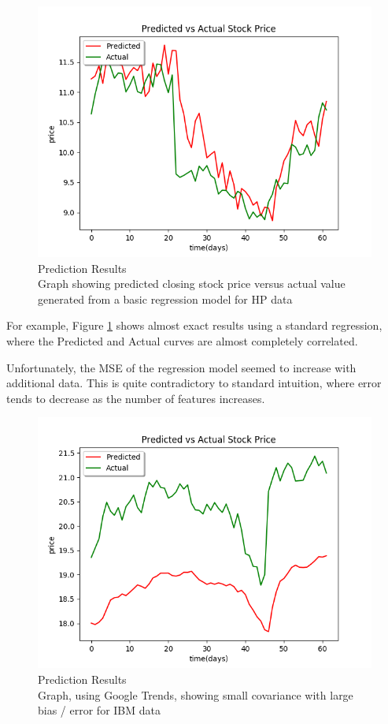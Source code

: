 \documentclass{article}
\begin{document}
\begin{figure}[H]
	\centering
    \includegraphics[scale=0.5]{googleHP.png}
  \caption{Prediction Results \\
  \small Graph showing predicted closing stock price versus actual value generated from a basic regression model for HP data}
  \label{fig:googlehp}
\end{figure}
For example, Figure \ref{fig:googlehp} shows almost exact results using a standard regression, where the Predicted and Actual curves are almost completely correlated. 

Unfortunately, the MSE of the regression model seemed to increase with additional data. This is quite contradictory to standard intuition, where error tends to decrease as the number of features increases. 

\begin{figure}[H]
	\centering
    \includegraphics[scale=0.5]{googleIBM.png}
  \caption{Prediction Results \\
  \small Graph, using Google Trends, showing small covariance with large bias / error for IBM data}
  \label{fig:googleibm}
\end{figure}
\end{document}
